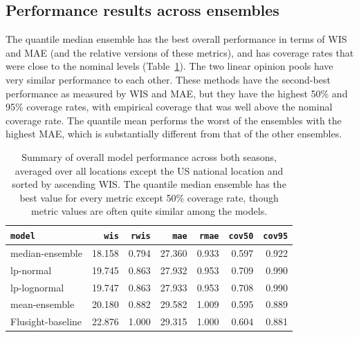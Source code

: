 \documentclass[
  letterpaper,
  DIV=11,
  numbers=noendperiod]{scrartcl}
\begin{document}
\subsection{Performance results across
ensembles}\label{performance-results-across-ensembles}

The quantile median ensemble has the best overall performance in terms
of WIS and MAE (and the relative versions of these metrics), and has
coverage rates that were close to the nominal levels
(Table~\ref{tbl-overall-evaluation}). The two linear opinion pools have
very similar performance to each other. These methods have the
second-best performance as measured by WIS and MAE, but they have the
highest 50\% and 95\% coverage rates, with empirical coverage that was
well above the nominal coverage rate. The quantile mean performs the
worst of the ensembles with the highest MAE, which is substantially
different from that of the other ensembles.

\begin{longtable}[]{@{}lrrrrrr@{}}

\caption{\label{tbl-overall-evaluation}Summary of overall model
performance across both seasons, averaged over all locations except the
US national location and sorted by ascending WIS. The quantile median
ensemble has the best value for every metric except 50\% coverage rate,
though metric values are often quite similar among the models.}

\tabularnewline

\toprule\noalign{}
\texttt{model} & \texttt{wis} & \texttt{rwis} & \texttt{mae} &
\texttt{rmae} & \texttt{cov50} & \texttt{cov95} \\
\midrule\noalign{}
\endhead
\bottomrule\noalign{}
\endlastfoot
median-ensemble & 18.158 & 0.794 & 27.360 & 0.933 & 0.597 & 0.922 \\
lp-normal & 19.745 & 0.863 & 27.932 & 0.953 & 0.709 & 0.990 \\
lp-lognormal & 19.747 & 0.863 & 27.933 & 0.953 & 0.708 & 0.990 \\
mean-ensemble & 20.180 & 0.882 & 29.582 & 1.009 & 0.595 & 0.889 \\
Flusight-baseline & 22.876 & 1.000 & 29.315 & 1.000 & 0.604 & 0.881 \\

\end{longtable}
\end{document}
